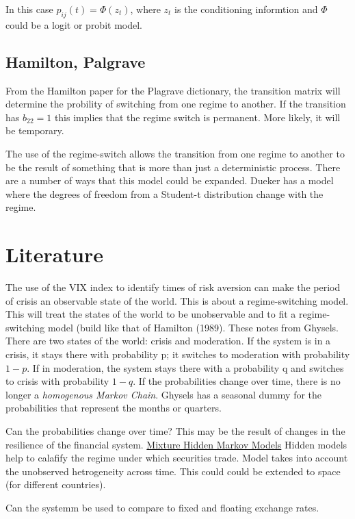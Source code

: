 \documentclass[12pt, a4paper, oneside]{article} %
\begin{document}
In this case $p_{ij}(t) = \Phi(z_t)$, where $z_t$ is the conditioning informtion and $\Phi$ could be a logit or probit model.  



\subsection{Hamilton, Palgrave}
From the Hamilton paper for the Plagrave dictionary, the transition matrix will determine the probility of switching from one regime to another.  If the transition has $b_{22} = 1$ this implies that the regime switch is permanent. More likely, it will be temporary. 
 
The use of the regime-switch allows the transition from one regime to another to be the result of something that is more than just a deterministic process. There are a number of ways that this model could be expanded.  Dueker has a model where the degrees of freedom from a Student-t distribution change with the regime.  

\section{Literature}
The use of the VIX index to identify times of risk aversion can make the period of crisis an observable state of the world. This is about a regime-switching model. This will treat the states of the world to be unobservable and to fit a regime-switching model (build like that of Hamilton (1989).  These notes from Ghysels.  There are two states of the world:  crisis and moderation.  If the system is in a crisis, it stays there with probability p; it switches to moderation with probability $1-p$.  If in moderation, the system stays there with a probability q and switches to crisis with probability $1-q$.  If the probabilities change over time, there is no longer a \emph{homogenous Markov Chain}. Ghysels has a seasonal dummy for the probabilities that represent the months or quarters.  

Can the probabilities change over time?  This may be the result of changes in the resilience of the financial system. 
\href{http://members.home.nl/jeroenvermunt/dias2010.pdf}{Mixture Hidden Markov Models} Hidden models help to calafify the regime under which securities trade. Model takes into account the unobserved hetrogeneity across time. This could could be extended to space (for different countries).  

Can the systemm be used to compare to fixed and floating exchange rates. 
\end{document}
